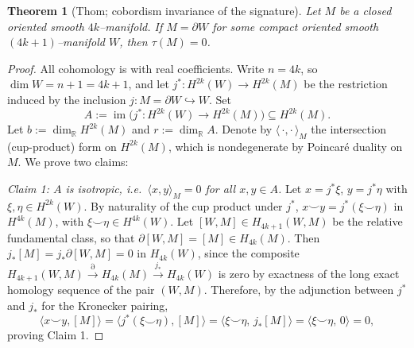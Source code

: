 \documentclass[12pt]{article}
\newtheorem{theorem}{Theorem}
\theoremstyle{definition}
\begin{document}
\begin{theorem}[Thom; cobordism invariance of the signature]\label{thm:cobinv}
Let $M$ be a closed oriented smooth $4k$--manifold.  If $M=\partial W$ for some compact
oriented smooth $(4k{+}1)$--manifold $W$, then $\tau(M)=0$.
\end{theorem}

\begin{proof}
All cohomology is with real coefficients.  Write $n=4k$, so $\dim W=n+1=4k+1$, and let
$j^\ast\colon H^{2k}(W)\to H^{2k}(M)$ be the restriction induced by the inclusion
$j\colon M=\partial W\hookrightarrow W$.  Set
\[
A:=\operatorname{im}\big(j^\ast\colon H^{2k}(W)\to H^{2k}(M)\big)\subseteq H^{2k}(M).
\]
Let $b:=\dim_{\mathbb R} H^{2k}(M)$ and $r:=\dim_{\mathbb R}A$.  Denote by
$\langle\,\cdot,\cdot\,\rangle_M$ the intersection (cup-product) form on $H^{2k}(M)$,
which is nondegenerate by Poincar\'e duality on $M$.  We prove two claims:
\smallskip

\noindent\emph{Claim 1: $A$ is isotropic, i.e.\ $\langle x,y\rangle_M=0$ for all
$x,y\in A$.}\;
Let $x=j^\ast\xi$, $y=j^\ast\eta$ with $\xi,\eta\in H^{2k}(W)$.  By naturality of the cup
product under $j^\ast$, $x\smile y=j^\ast(\xi\smile\eta)$ in $H^{4k}(M)$, with
$\xi\smile\eta\in H^{4k}(W)$.  Let $[W,M]\in H_{4k+1}(W,M)$ be the relative fundamental
class, so that $\partial[W,M]=[M]\in H_{4k}(M)$.  Then $j_\ast[M]=j_\ast\partial[W,M]=0$
in $H_{4k}(W)$, since the composite $H_{4k+1}(W,M)\xrightarrow{\partial}H_{4k}(M)
\xrightarrow{j_\ast}H_{4k}(W)$ is zero by exactness of the long exact homology sequence of
the pair $(W,M)$.  Therefore, by the adjunction between $j^\ast$ and $j_\ast$ for the
Kronecker pairing,
\[
\big\langle x\smile y,[M]\big\rangle
=\big\langle j^\ast(\xi\smile\eta),[M]\big\rangle
=\big\langle \xi\smile\eta,\,j_\ast[M]\big\rangle
=\big\langle \xi\smile\eta,\,0\big\rangle=0 ,
\]
proving Claim 1.
\smallskip


\end{proof}
\end{document}
